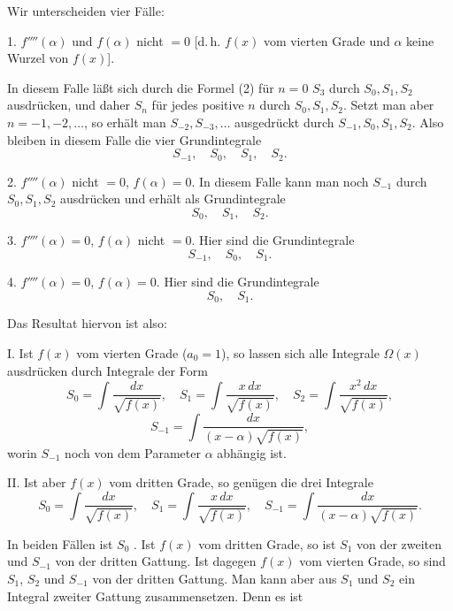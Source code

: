
Wir unterscheiden vier F\"alle:

1. $f''''(\alpha)$ und $f(\alpha)$ nicht $=0$ [d.\,h. $f(x)$ vom vierten Grade und $\alpha$ keine Wurzel von $f(x)$].

In diesem Falle l\"a\ss t sich durch die Formel (2) f\"ur $n=0$ $S_3$ durch $S_0, S_1, S_2$ ausdr\"ucken, und daher $S_n$ f\"ur jedes positive $n$ durch $S_0, S_1, S_2$. Setzt man aber $n=-1,-2,\ldots$, so erh\"alt man $S_{-2}, S_{-3}, \ldots$ ausgedr\"uckt durch $S_{-1}, S_0, S_1, S_2$. Also bleiben in diesem Falle die vier Grundintegrale
\[
S_{-1}, \quad S_0, \quad S_1, \quad S_2.
\]

2. $f''''(\alpha)$ nicht $=0$, $f(\alpha)=0$. In diesem Falle kann man noch $S_{-1}$ durch $S_0, S_1, S_2$ ausdr\"ucken und erh\"alt als Grundintegrale
\[
S_0, \quad S_1, \quad S_2.
\]

3. $f''''(\alpha)=0$, $f(\alpha)$ nicht $=0$. Hier sind die Grundintegrale
\[
S_{-1}, \quad S_0, \quad S_1.
\]

4. $f''''(\alpha)=0$, $f(\alpha)=0$. Hier sind die Grundintegrale
\[
S_0, \quad S_1.
\]

Das Resultat hiervon ist also:

I. Ist $f(x)$ vom vierten Grade ($a_0=1$), so lassen sich alle Integrale $\Omega(x)$ ausdr\"ucken durch Integrale der Form
\[
S_0 = \int \frac{dx}{\sqrt{f(x)}}, \quad S_1 = \int \frac{x\,dx}{\sqrt{f(x)}}, \quad S_2 = \int \frac{x^2\,dx}{\sqrt{f(x)}},
\]
\[
S_{-1} = \int \frac{dx}{(x-\alpha)\sqrt{f(x)}},
\]
worin $S_{-1}$ noch von dem Parameter $\alpha$ abh\"angig ist.

II. Ist aber $f(x)$ vom dritten Grade, so gen\"ugen die drei Integrale
\[
S_0 = \int \frac{dx}{\sqrt{f(x)}}, \quad S_1 = \int \frac{x\,dx}{\sqrt{f(x)}}, \quad S_{-1} = \int \frac{dx}{(x-\alpha)\sqrt{f(x)}}.
\]

In beiden F\"allen ist $S_0$ . Ist $f(x)$ vom dritten Grade, so ist $S_1$ von der zweiten und $S_{-1}$ von der dritten Gattung. Ist dagegen $f(x)$ vom vierten Grade, so sind $S_1$, $S_2$ und $S_{-1}$ von der dritten Gattung. Man kann aber aus $S_1$ und $S_2$ ein Integral zweiter Gattung zusammensetzen. Denn es ist
